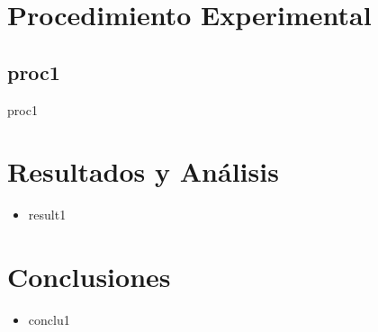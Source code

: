 \documentclass[letterpaper,12pt]{report}
\begin{document}
    \section*{Procedimiento Experimental}
        \subsection*{proc1}
            proc1
            
    \section*{Resultados y Análisis}
        \begin{itemize}
            \item result1
        \end{itemize}
    \section*{Conclusiones}
        \begin{itemize}
            \item   conclu1
        \end{itemize}
\end{document}
